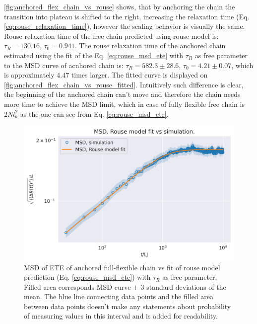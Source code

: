 \documentclass[
    paper=A4,pagesize=automedia,fontsize=12pt,
    BCOR=15mm,DIV=22,
    twoside,headinclude,footinclude=false,
    fleqn,             %
    bibliography=totocnumbered,          %
    listof=totoc,                %
    listof=flat,                 %
    cleardoublepage=empty      %
    numbers=endperiod
]{scrartcl}
\begin{document}
\autoref{fig:anchored_flex_chain_vs_rouse} shows, that by anchoring the chain
the transition into plateau is shifted to the right, increasing the 
relaxation time (Eq. \ref{eq:rouse_relaxation_time}), 
however the scaling behavior is visually the same. Rouse relaxation time
of the free chain predicted using rouse model is: $\tau_R=130.16$, $\tau_0=0.941$. 
The rouse relaxation time of the anchored chain estimated 
using the fit of the Eq. \ref{eq:rouse_msd_ete} with $\tau_R$ as free parameter
to the MSD curve of acnhored chain is: 
$\tau_R=582.3 \pm 28.6$, $\tau_0=4.21 \pm 0.07$, which is approximately $4.47$ times
larger. The fitted curve is displayed on
\autoref{fig:anchored_flex_chain_vs_rouse_fitted}.
Intuitively such difference is clear, the beginning of the anchored chain
can't move and therefore the chain needs more time to achieve the MSD limit, which
in case of fully flexible free chain is $2Nl_b^2$ as the one can see from Eq. \ref{eq:rouse_msd_ete}. 


\begin{figure}
    \begin{center}
      \includegraphics[width=\columnwidth,trim={0cm 0cm 0cm 0.8cm},clip]{3-exp-free-param-log.png}
      \caption{\label{fig:anchored_flex_chain_vs_rouse_fitted}
      MSD of ETE of anchored full-flexible chain vs fit of rouse model prediction 
      (Eq. \ref{eq:rouse_msd_ete}) with $\tau_R$ as free parameter.
      Filled area corresponds MSD curve $\pm$ 3 standard deviations of the mean. The
      blue line connecting data points and the filled area between data points doesn't make
      any statements about probability of measuring values in this interval and is
      added for readability.
      }
    \end{center}
\end{figure}
\end{document}
